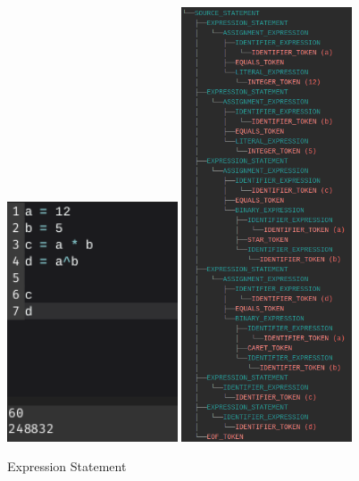 \documentclass[
]{report}
\begin{document}
\begin{appendices}
	\begin{figure}
		\centering
		\includegraphics[width=0.45\textwidth]{expression-code}
		\includegraphics[width=0.45\textwidth]{expression-tree}
		\caption{Expression Statement}
		\label{fig:expression-statement}
	\end{figure}
	\begin{figure}
		\centering

\end{figure}
\end{appendices}
\end{document}
